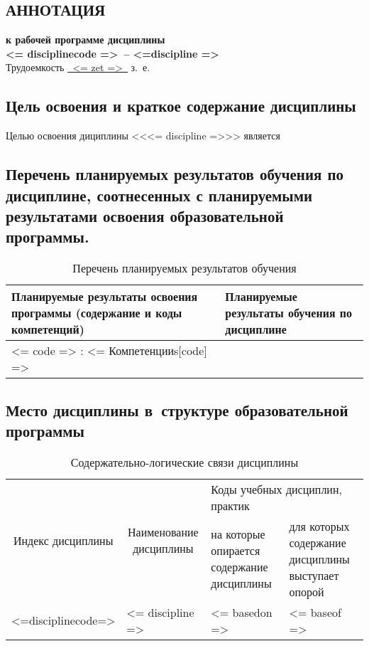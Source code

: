\documentclass[a4paper,12pt]{article}
\begin{document}
\newpage


\begin{center}
\section{АННОТАЦИЯ}
{\bf к рабочей программе дисциплины\\
<= disciplinecode =>\ -- <=discipline =>} \\
Трудоемкость \uline{~<= zet =>~} з.~е.
\end{center}


\subsection{Цель освоения и краткое содержание дисциплины}
Целью освоения дициплины <<<= discipline =>>> является


\subsection{Перечень планируемых результатов обучения по дисциплине, соотнесенных с планируемыми результатами освоения образовательной программы.}
\begin{longtable}{|p{8cm}|p{8cm}|}
\caption{Перечень планируемых результатов обучения}\\
\hline
\centering
Планируемые результаты освоения программы (содержание и коды компетенций) & 
\centering\arraybackslash
Планируемые результаты обучения по дисциплине
\\
\hline
<= code => : <= Компетенцииs[code] =>%
& \\
\hline
\end{longtable}


\subsection{Место дисциплины в~структуре образовательной программы}

  \begin{table}[H]
  \setlength\arraycolsep{3pt}
  \caption{Содержательно-логические связи дисциплины}
  \begin{tabular}{|l|p{18ex}|*{2}{p{23ex}|}}
  \hline
  \multicolumn{1}{|c|}{\multirow{2}{13ex}{\centering Индекс \linebreak дисциплины}} &
  \multicolumn{1}{c|}{\multirow{2}{18ex}{\centering Наименование \linebreak дисциплины}} & 
  \multicolumn{2}{p{46ex}|}{\centering Коды учебных дисциплин, практик} \\
  \cline{3-4}
   & & 
  \centering на которые опирается содержание дисциплины & 
  \centering\arraybackslash для которых содержание дисциплины выступает опорой
  \\ \hline
  <=disciplinecode=> & <= discipline => & <= basedon => & <= baseof =>
  \\ \hline
  \end{tabular}
  \end{table}
\end{document}
